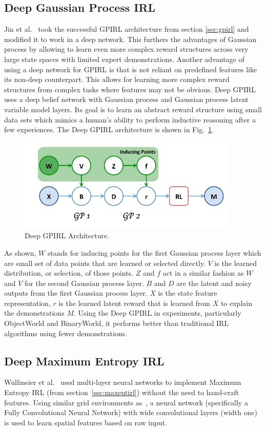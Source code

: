 \documentclass[12pt,american]{report}
\begin{document}
\subsection{Deep Gaussian Process IRL}
Jin et al.~\cite{jin2015inverse} took the successful GPIRL architecture from section \ref{sec:gpirl} and modified it to work in a deep network. This furthers the advantages of Gaussian process by allowing to learn even more complex reward structures across very large state spaces with limited expert demonstrations. Another advantage of using a deep network for GPIRL is that is not reliant on predefined features like its non-deep counterpart.  This allows for learning more complex reward structures from complex tasks where features may not be obvious.  Deep GPIRL uses a deep belief network with Gaussian process and Gaussian process latent variable model layers. Its goal is to learn an abstract reward structure using small data sets which mimics a human's ability to perform inductive reasoning after a few experiences. The Deep GPIRL architecture is shown in Fig.~\ref{fig:dgpirl-arch}.
\begin{figure}
\centering
\includegraphics[scale=1.5]{images/dgpirl-arch.png}
\caption{Deep GPIRL Architecture.~\cite{jin2015inverse}}
\label{fig:dgpirl-arch}
\end{figure}
 As shown, $W$ stands for inducing points for the first Gaussian process layer which are small set of data points that are learned or selected directly. $V$ is the learned distribution, or selection, of those points.  $Z$ and $f$ act in a similar fashion as $W$ and $V$ for the second Gaussian process layer. $B$ and $D$ are the latent and noisy outputs from the first Gaussian process layer. $X$ is the state feature representation, $r$ is the learned latent reward that is learned from $X$ to explain the demonstrations $M$.  Using the Deep GPIRL in experiments, particularly ObjectWorld and BinaryWorld, it performs better than traditional IRL algorithms using fewer demonstrations. 

\label{sec:maxentdeepirl}
\subsection{Deep Maximum Entropy IRL}
Wulfmeier et al.~\cite{wulfmeier2015maximum} used multi-layer neural networks to implement Maximum Entropy IRL (from section~\ref{sec:maxentirl}) without the need to hand-craft features. Using similar grid environments as~\cite{ziebart2008maximum}, a neural network (specifically a Fully Convolutional Neural Network) with wide convolutional layers (width one) is used to learn spatial features based on raw input.  
\end{document}

